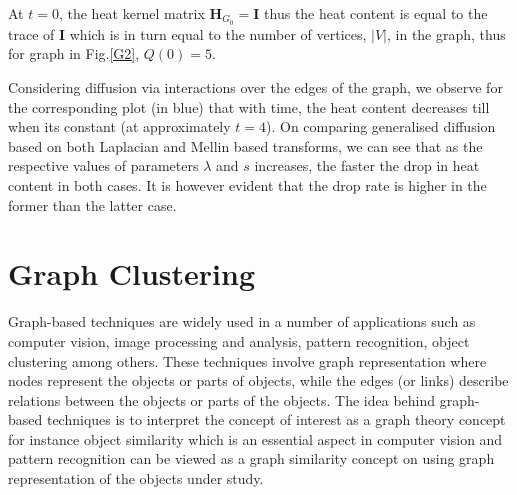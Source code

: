 \documentclass[10pt,a4paper]{article}
\theoremstyle{plain}
\theoremstyle{definition}
\begin{document}
At $t=0$, the heat kernel matrix $\mathbf{H}_{G_0} = \mathbf{I}$ thus the heat content is equal to the trace of  $\mathbf{I}$ which is in turn equal to the number of vertices, $|V|$, in the graph, thus for graph in Fig.\ref{G2}, $Q(0) = 5$.

Considering diffusion via interactions over the edges of the graph, we observe for the corresponding plot (in blue) that with time, the heat content decreases till when its constant (at approximately $t=4$). On comparing generalised diffusion based on both Laplacian and Mellin based transforms, we can see that as the respective values of parameters $\lambda$ and $s$ increases, the faster the drop in heat content in both cases. It is however evident that the drop rate is higher in the former than the latter case. 
 
 
 \newpage
\section{Graph Clustering}

Graph-based techniques are widely used in a number of applications such as computer vision,  image processing and analysis, pattern recognition, object clustering among others. These techniques involve graph representation where nodes represent the objects or parts of objects, while the edges (or links) describe relations between the objects or parts of the objects. The idea behind graph-based techniques is to interpret the concept of interest as a graph theory concept for instance object similarity which is an essential aspect in computer vision and pattern recognition can be viewed as a graph similarity concept on using graph representation of the objects under study.
\end{document}
